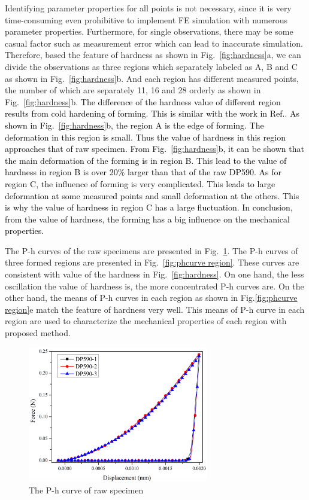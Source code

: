 \documentclass[review]{elsarticle}
\begin{document}
Identifying parameter properties for all points is not necessary, since it is very time-consuming even prohibitive to implement FE simulation with numerous parameter properties. Furthermore, for single observations, there may be some casual factor such as measurement error which can lead to inaccurate simulation. Therefore, based the feature of hardness as shown in Fig.~\ref{fig:hardness}a, we can divide the observations as three regions which separately labeled as A, B and C as shown in Fig.~\ref{fig:hardness}b. And each region has different measured points, the number of which are separately 11, 16 and 28 orderly as shown in Fig.~\ref{fig:hardness}b. \textcolor{black}{The difference of the hardness value of different region results from cold hardening of forming. This is similar with the work in Ref.\cite{sun2014determination}. As shown in Fig.~\ref{fig:hardness}b, the region A is the edge of forming. The deformation in this region is small. Thus the value of hardness in this region approaches that of raw specimen. From Fig.~\ref{fig:hardness}b, it can be shown that the main deformation of the forming is in region B. This lead to the value of hardness in region B is over 20\% larger than that of the raw DP590. As for region C, the influence of forming is very complicated. This leads to large deformation at some measured points and small deformation at the others. This is why the value of hardness in region C has a large fluctuation. In conclusion, from the value of hardness, the forming has a big influence on the mechanical properties.}

The P-h curves of the raw specimens are presented in Fig.~\ref{fig:rawDP590}. The P-h curves of three formed regions are presented in Fig.~\ref{fig:phcurve region}. These curves are consistent with value of the hardness in Fig.~\ref{fig:hardness}. On one hand, the less oscillation the value of hardness is, the more concentrated P-h curves are. On the other hand, the means of P-h curves in each region as shown in Fig.\ref{fig:phcurve region}e match the feature of hardness very well. This means of P-h curve in each region are used to characterize the mechanical properties of each region with proposed method. 

\begin{figure}[h!]
\centering
\includegraphics[width=0.7\textwidth]{./figs/DP590.png}
\caption{The P-h curve of raw specimen}
\label{fig:rawDP590}
\end{figure}
\end{document}
